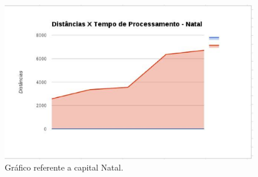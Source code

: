 \begin{figure}[!htb]
 \centering
 \includegraphics[scale= 0.5]{figuras/imagem4.eps}
 \caption{Gráfico referente a capital Natal.}
\end{figure}